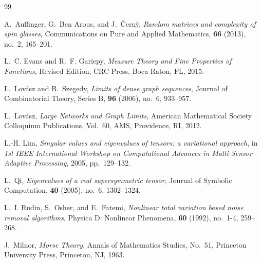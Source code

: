 \documentclass[11pt,a4paper,reqno]{amsart}
\theoremstyle{definition}
\numberwithin{equation}{section}
\begin{document}
\begin{thebibliography}{99}

A.~Auffinger, G.~Ben Arous, and J.~{\v{C}}ern{\`y},
\emph{Random matrices and complexity of spin glasses},
Communications on Pure and Applied Mathematics, \textbf{66} (2013), no.~2, 165--201.

L.~C. Evans and R.~F. Gariepy,
\emph{Measure Theory and Fine Properties of Functions},
Revised Edition, CRC Press, Boca Raton, FL, 2015.

L.~Lov{\'a}sz and B.~Szegedy,
\emph{Limits of dense graph sequences},
Journal of Combinatorial Theory, Series B, \textbf{96} (2006), no.~6, 933--957.

L.~Lov{\'a}sz,
\emph{Large Networks and Graph Limits},
American Mathematical Society Colloquium Publications, Vol.~60, AMS, Providence, RI, 2012.

L.-H. Lim,
\emph{Singular values and eigenvalues of tensors: a variational approach},
in \emph{1st IEEE International Workshop on Computational Advances in Multi-Sensor Adaptive Processing}, 2005, pp.~129--132.

L.~Qi,
\emph{Eigenvalues of a real supersymmetric tensor},
Journal of Symbolic Computation, \textbf{40} (2005), no.~6, 1302--1324.

L.~I. Rudin, S.~Osher, and E.~Fatemi,
\emph{Nonlinear total variation based noise removal algorithms},
Physica D: Nonlinear Phenomena, \textbf{60} (1992), no.~1-4, 259--268.

J.~Milnor,
\emph{Morse Theory},
Annals of Mathematics Studies, No.~51, Princeton University Press, Princeton, NJ, 1963.

\end{thebibliography}
\end{document}
